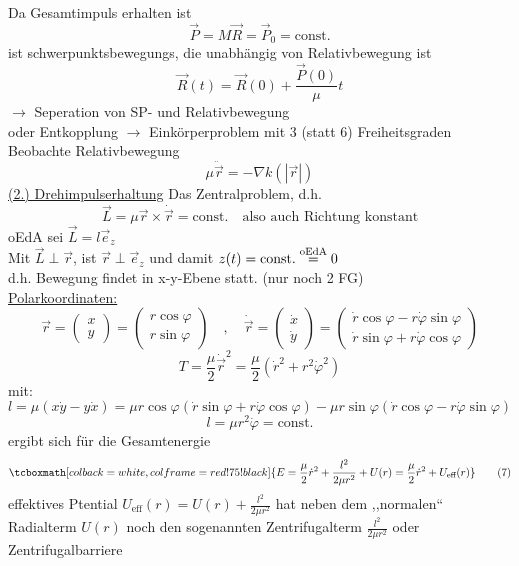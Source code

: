 \documentclass[titlepage,12pt,a4paper,ngerman]{report}
\newcommand{\tx}[1]{\textrm{#1}}
\newcommand{\rmbox}[1]{\tcboxmath[colback=white,colframe=red!75!black]{#1}} %
\renewcommand{\boxed}{\rmbox}
\begin{document}
{Da Gesamtimpuls erhalten ist
$$\vec{P} = M \vec{R} = \vec{P}_0 = \tx{const.}$$
ist schwerpunktsbewegungs, die unabhängig von Relativbewegung ist
$$\vec{R}(t) = \vec{R}(0) + \frac{\vec{P}(0)}{\mu}t$$
$\rightarrow$ Seperation von SP- und Relativbewegung\\
oder Entkopplung $\rightarrow$ Einkörperproblem mit 3 (statt 6) Freiheitsgraden\\
Beobachte Relativbewegung
$$\mu \ddot{\vec{r}} = - \nabla k(|\vec{r}|)$$
\underline{(2.) Drehimpulserhaltung}
Das Zentralproblem, d.h.
$$\vec{L} = \mu \vec{r} \times \dot{\vec{r}} = \textrm{const.} \quad \tx{also auch Richtung konstant}$$
oEdA sei $\vec{L} = l \vec{e}_z$\\
Mit $\vec{L} \perp \vec{r}$, ist $\vec{r} \perp \vec{e}_z$ und damit $z(t) = \tx{const.} \buildrel \tx{oEdA} \over = 0$\\
d.h. Bewegung findet in x-y-Ebene statt. (nur noch 2 FG)\\
\underline{Polarkoordinaten:}
$$\vec{r} = \begin{pmatrix}
x\\y
\end{pmatrix} = \begin{pmatrix}
r \cos \varphi \\ r \sin \varphi
\end{pmatrix} \quad , \quad \dot{\vec{r}} = \begin{pmatrix}
\dot{x} \\ \dot{y}
\end{pmatrix} = \begin{pmatrix}
\dot{r} \cos \varphi - r \dot{\varphi} \sin \varphi \\ \dot{r} \sin \varphi + r \dot{\varphi} \cos \varphi
\end{pmatrix} $$
$$T = \frac{\mu}{2} \dot{\vec{r}}^2 = \frac{\mu}{2} ( \dot{r}^2 + r^2 \dot{\varphi}^2)$$
mit:
$$ l = \mu(x\dot{y} - y \dot{x}) = \mu r \cos \varphi ( \dot{r} \sin \varphi + r \dot{\varphi} \cos \varphi) - \mu r \sin \varphi ( \dot{r} \cos \varphi - r \dot{\varphi} \sin \varphi)$$
$$l = \mu r^2 \dot{\varphi} = \tx{const.}$$
ergibt sich für die Gesamtenergie
\begin{equation*}
\boxed{ E = \frac{\mu}{2} \dot{r}^2 + \frac{l^2}{2 \mu r^2} + U(r) = \frac{\mu}{2} \dot{r}^2 + U_{\tx{eff}}(r)} \tag{7}
\end{equation*}
effektives Ptential $ U_{\tx{eff}} (r) = U(r)  + \frac{l^2}{2 \mu r^2}$ hat neben dem ,,normalen`` Radialterm $U(r)$ noch den sogenannten Zentrifugalterm $ \frac{l^2}{2 \mu r^2} $ oder Zentrifugalbarriere\\\\
}
\end{document}
